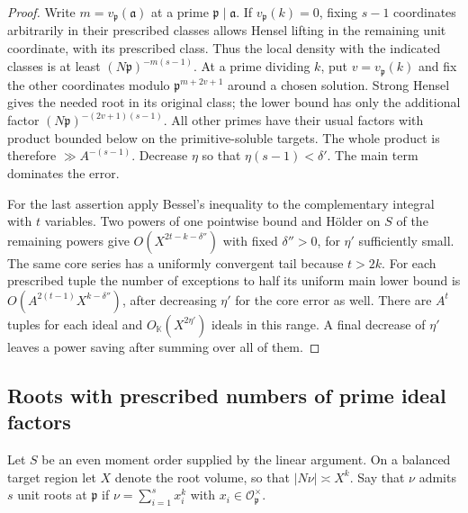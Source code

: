 \documentclass[11pt,letterpaper]{article}
\theoremstyle{definition}
\numberwithin{equation}{section}
\begin{document}
\begin{proof}
Write $m=v_{\mathfrak p}(\mathfrak a)$ at a prime
$\mathfrak p\mid\mathfrak a$. If $v_{\mathfrak p}(k)=0$, fixing
$s-1$ coordinates arbitrarily in their prescribed classes allows
Hensel lifting in the remaining unit coordinate, with its prescribed
class. Thus the local density with the indicated classes is at
least $(N\mathfrak p)^{-m(s-1)}$. At a prime dividing $k$, put
$v=v_{\mathfrak p}(k)$ and fix the other coordinates modulo
$\mathfrak p^{m+2v+1}$ around a chosen solution. Strong Hensel
gives the needed root in its original class; the lower bound has
only the additional factor $(N\mathfrak p)^{-(2v+1)(s-1)}$.
All other primes have their usual factors with product bounded
below on the primitive-soluble targets. The whole product is
therefore $\gg A^{-(s-1)}$. Decrease $\eta$ so that
$\eta(s-1)<\delta'$. The main term dominates the error.

For the last assertion apply Bessel's inequality to the
complementary integral with $t$ variables. Two powers of one
pointwise bound and H\"older on $S$ of the remaining powers give
$O(X^{2t-k-\delta''})$ with fixed $\delta''>0$, for $\eta'$
sufficiently small. The same core series has a uniformly convergent
tail because $t>2k$. For each prescribed tuple the number of
exceptions to half its uniform main lower bound is
$O(A^{2(t-1)}X^{k-\delta''})$, after decreasing $\eta'$ for the
core error as well. There are $A^t$ tuples for each ideal and
$O_{\mathbb K}(X^{2\eta'})$ ideals in this range. A final decrease
of $\eta'$ leaves a power saving after summing over all of them.
\end{proof}

\subsection{Roots with prescribed numbers of prime ideal factors}
\label{sec:nf-almost-primes}
Let $S$ be an even moment order supplied by the linear argument.
On a balanced target region let $X$ denote the root volume, so that
$|N\nu|\asymp X^k$. Say that $\nu$ admits $s$ unit roots at
$\mathfrak p$ if $\nu=\sum_{i=1}^s x_i^k$ with
$x_i\in\mathcal O_{\mathfrak p}^{\times}$.
\end{document}
